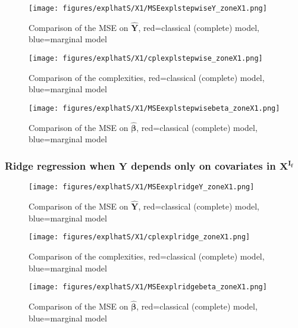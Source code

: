 \documentclass[12pt,a4paper]{report}
\begin{document}
	\begin{figure}[h!]
	\centering
		  \texttt{[image: figures/explhatS/X1/MSEexplstepwiseY\_zoneX1.png]}
		\caption{Comparison of the MSE on $\hat{\boldsymbol{Y}}$, red=classical (complete) model, blue=marginal model}\label{MSEexplstepwiseY_zoneX1}
	\end{figure}
	\begin{figure}[h!]
	\centering
		  \texttt{[image: figures/explhatS/X1/cplexplstepwise\_zoneX1.png]}
		\caption{Comparison of the complexities, red=classical (complete) model, blue=marginal model}\label{cplexplstepwise_zoneX1}
	\end{figure}
	\begin{figure}[h!]
	\centering
		  \texttt{[image: figures/explhatS/X1/MSEexplstepwisebeta\_zoneX1.png]}
		\caption{Comparison of the MSE on $\hat{\boldsymbol{\beta}}$, red=classical (complete) model, blue=marginal model}\label{MSEexplstepwisebeta_zoneX1}
	\end{figure}
	\FloatBarrier
\newpage
\subsubsection{Ridge regression when $\boldsymbol{Y}$ depends only on covariates in $\boldsymbol{X^{I_f}}$}
	
\begin{figure}[h!]
	\centering
		  \texttt{[image: figures/explhatS/X1/MSEexplridgeY\_zoneX1.png]}
		\caption{Comparison of the MSE on $\hat{\boldsymbol{Y}}$, red=classical (complete) model, blue=marginal model}\label{MSEexplridgeY_zoneX1}
	\end{figure}
	\begin{figure}[h!]
	\centering
		  \texttt{[image: figures/explhatS/X1/cplexplridge\_zoneX1.png]}
		\caption{Comparison of the complexities, red=classical (complete) model, blue=marginal model}\label{cplexplridge_zoneX1}
	\end{figure}
	\begin{figure}[h!]
	\centering
		  \texttt{[image: figures/explhatS/X1/MSEexplridgebeta\_zoneX1.png]}
		\caption{Comparison of the MSE on $\hat{\boldsymbol{\beta}}$, red=classical (complete) model, blue=marginal model}\label{MSEexplridgebeta_zoneX1}
	\end{figure}
	\FloatBarrier
\end{document}
